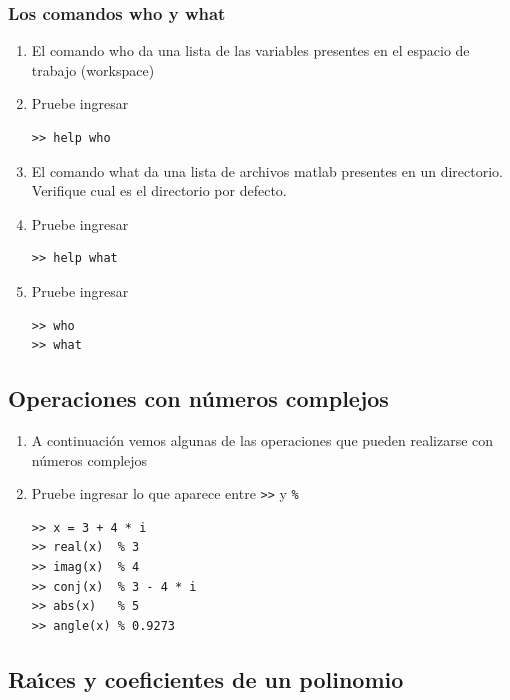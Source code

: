 \subsubsection{Los comandos who y what}

\begin{enumerate}
\item El comando who da una lista de las variables presentes en el espacio
de trabajo (workspace)

\item Pruebe ingresar
\begin{verbatim}
>> help who
\end{verbatim}

\item El comando what da una lista de archivos matlab presentes en un
directorio.  Verifique cual es el directorio por defecto.

\item Pruebe ingresar
\begin{verbatim}
>> help what
\end{verbatim}

\item Pruebe ingresar
\begin{verbatim}
>> who
>> what
\end{verbatim}

\end{enumerate}

\subsection{Operaciones con n\'{u}meros complejos}

\begin{enumerate}
\item A continuaci\'{o}n vemos algunas de las operaciones que pueden
realizarse con n\'{u}meros complejos

\item Pruebe ingresar lo que aparece entre \verb->>- y \verb-%-
\begin{verbatim}
>> x = 3 + 4 * i
>> real(x)  % 3
>> imag(x)  % 4
>> conj(x)  % 3 - 4 * i
>> abs(x)   % 5
>> angle(x) % 0.9273
\end{verbatim}
\end{enumerate}

\subsection{Ra\'{\i}ces y coeficientes de un polinomio}

